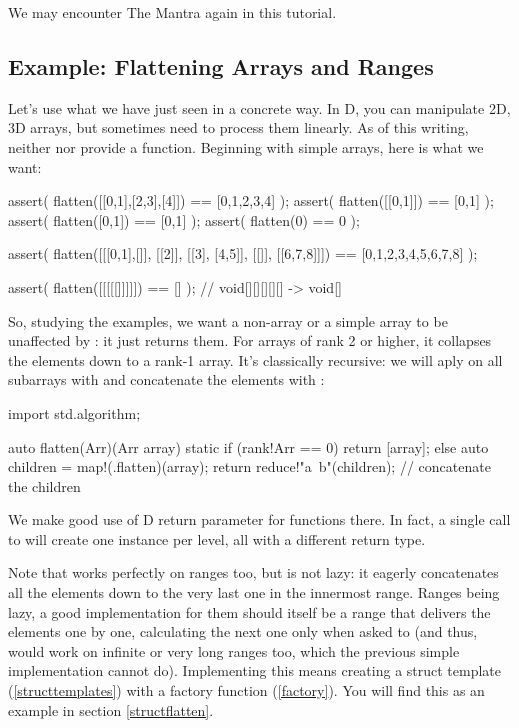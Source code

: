 We may encounter The Mantra again in this tutorial.

\subsection{Example: Flattening Arrays and Ranges}\label{functionflatten}

Let's use what we have just seen in a concrete way. In D, you can manipulate 2D, 3D arrays, but sometimes need to process them linearly. As of this writing, neither  nor  provide a  function. Beginning with simple arrays, here is what we want:

\begin{dcode}
assert( flatten([[0,1],[2,3],[4]]) == [0,1,2,3,4] );
assert( flatten([[0,1]]) == [0,1] );
assert( flatten([0,1]) == [0,1] );
assert( flatten(0) == 0 );

assert( flatten([[[0,1],[]], [[2]], [[3], [4,5]], [[]], [[6,7,8]]])
             == [0,1,2,3,4,5,6,7,8] );

assert( flatten([[[[[]]]]]) == [] ); // void[][][][][] -> void[]
\end{dcode}

So, studying the examples, we want a non-array or a simple array to be unaffected by : it just returns them. For arrays of rank 2 or higher, it collapses the elements down to a rank-1 array. It's classically recursive: we will aply  on all subarrays with  and concatenate the elements with :

\begin{dcode}
import std.algorithm;

auto flatten(Arr)(Arr array)
{
    static if (rank!Arr == 0)
        return [array];
    else
    {
        auto children = map!(.flatten)(array);
        return reduce!"a~b"(children); // concatenate the children
    }
}
\end{dcode}

We make good use of D  return parameter for functions there. In fact, a single call to  will create one instance per level, all with a different return type. 

Note that  works perfectly on ranges too, but is not lazy: it eagerly concatenates all the elements down to the very last one in the innermost range. Ranges being lazy, a good  implementation for them should itself be a range that delivers the elements one by one, calculating the next one only when asked to (and thus, would work on infinite or very long ranges too, which the previous simple implementation cannot do). Implementing this means creating a struct template (\ref{structtemplates}) with a factory function (\ref{factory}). You will find this as an example in section \ref{structflatten}.

